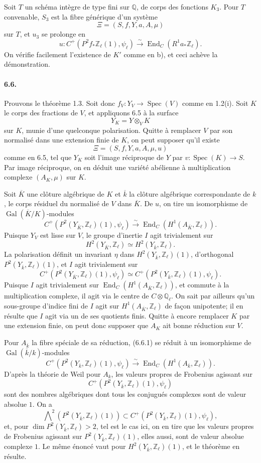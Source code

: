 \documentclass[10pt]{article}
\newcommand{\Q}{\mathbb{Q}}
\newcommand{\Z}{\mathbb{Z}}
\newcommand{\Gal}{\operatorname{Gal}}
\newcommand{\Spec}{\operatorname{Spec}}
\newcommand{\End}{\operatorname{End}}
\newcommand{\iso}{\xrightarrow{\sim}}
\begin{document}
Soit $T$ un schéma intègre de type fini sur $\Q$, de corps des fonctions $K_3$. Pour $T$ convenable, $S_3$ est la fibre générique d'un système
\[
\Xi=(S,f,Y,a,A,\mu)
\]
sur $T$, et $u_3$ se prolonge en
\[
u:C^+(P^2f_*\Z_\ell(1),\psi_\ell)\iso \End_C(R^1a_*\Z_\ell).
\]
On vérifie facilement l'existence de $K'$ comme en b), et ceci achève la démonstration.

\paragraph{6.6.} Prouvons le théorème 1.3. Soit donc $f_V:Y_V\to\Spec(V)$ comme en 1.2(i). Soit $K$ le corps des fractions de $V$, et appliquons 6.5 à la surface
\[
Y_K=Y\otimes_VK
\]
sur $K$, munie d'une quelconque polarisation. Quitte à remplacer $V$ par son normalisé dans une extension finie de $K$, on peut supposer qu'il existe
\[
\Xi=(S,f,Y,a,A,\mu,u)
\]
comme en 6.5, tel que $Y_K$ soit l'image réciproque de $Y$ par $v:\Spec(K)\to S$. Par image réciproque, on en déduit une variété abélienne à multiplication complexe $(A_K,\mu)$ sur $K$.

Soit $\overline K$ une clôture algébrique de $K$ et $\overline k$ la clôture algébrique correspondante de $k$, le corps résiduel du normalisé de $V$ dans $\overline K$. De $u$, on tire un isomorphisme de $\Gal(\overline K/K)$-modules
\[
\tag{6.6.1}
C^+(P^2(Y_{\overline K},\Z_\ell)(1),\psi_\ell)\iso
\End_C(H^1(A_{\overline K},\Z_\ell)).
\]
Puisque $Y_V$ est lisse sur $V$, le groupe d'inertie $I$ agit trivialement sur
\[
H^2(Y_{\overline K},\Z_\ell)\simeq H^2(Y_{\overline k},\Z_\ell).
\]
La polarisation définit un invariant $\eta$ dans $H^2(Y_{\overline k},\Z_\ell)(1)$, d'orthogonal $P^2(Y_{\overline k},\Z_\ell)(1)$, et $I$ agit trivialement sur
\[
C^+(P^2(Y_{\overline K},\Z_\ell)(1),\psi_\ell)\simeq
C^+(P^2(Y_{\overline k},\Z_\ell)(1),\psi_\ell).
\]
Puisque $I$ agit trivialement sur $\End_C(H^1(A_{\overline K},\Z_\ell))$, et commute à la multiplication complexe, il agit via le centre de $C\otimes\Q_\ell$. On sait par ailleurs qu'un sous-groupe d'indice fini de $I$ agit sur $H^1(A_{\overline K},\Z_\ell)$ de façon unipotente; il en résulte que $I$ agit via un de ses quotients finis. Quitte à encore remplacer $K$ par une extension finie, on peut donc supposer que $A_K$ ait bonne réduction sur $V$.

Pour $A_{\overline k}$ la fibre spéciale de sa réduction, (6.6.1) se réduit à un isomorphisme de $\Gal(\overline k/k)$-modules
\[
\tag{6.6.2}
C^+(P^2(Y_{\overline k},\Z_\ell)(1),\psi_\ell)\iso
\End_C(H^1(A_{\overline k},\Z_\ell)).
\]
D'après la théorie de Weil pour $A_k$, les valeurs propres de Frobenius agissant sur
\[
C^+(P^2(Y_{\overline k},\Z_\ell)(1),\psi_\ell)
\]
sont des nombres algébriques dont tous les conjugués complexes sont de valeur absolue $1$. On a
\[
\bigwedge\nolimits^2(P^2(Y_{\overline k},\Z_\ell)(1))\subset
C^+(P^2(Y_{\overline k},\Z_\ell)(1),\psi_\ell),
\]
et, pour $\dim P^2(Y_{\overline k},\Z_\ell)>2$, tel est le cas ici, on en tire que les valeurs propres de Frobenius agissant sur $P^2(Y_{\overline k},\Z_\ell)(1)$, elles aussi, sont de valeur absolue complexe $1$. Le même énoncé vaut pour $H^2(Y_{\overline k},\Z_\ell)(1)$, et le théorème en résulte.
\end{document}
